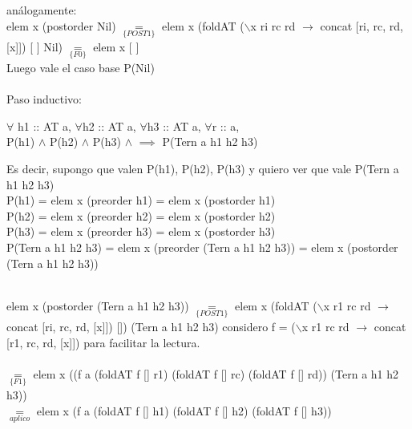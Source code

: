 \documentclass[10pt,a4paper]{article}
\begin{document}
\noindent análogamente: \\
elem x (postorder Nil) $\underset{\{POST1\}}{=}$ elem x (foldAT ($\backslash$x ri rc rd $\rightarrow$ concat [ri, rc, rd, [x]]) [ ] Nil) $\underset{\{F0\}}{=}$ elem x [ ] \\


Luego vale el caso base P(Nil)
\\ \\
Paso inductivo: 
\begin{center}
	$\forall$ h1 :: AT a, $\forall$h2 :: AT a, $\forall$h3 :: AT a, $\forall$r :: a, \\
	P(h1) $\land$ P(h2) $\land$ P(h3) $\land$ $\implies$ P(Tern a h1 h2 h3)
\end{center}
Es decir, supongo que valen P(h1), P(h2), P(h3) y quiero ver que vale P(Tern a h1 h2 h3) \\
P(h1) = elem x (preorder h1) = elem x (postorder h1) \\
P(h2) = elem x (preorder h2) = elem x (postorder h2) \\
P(h3) = elem x (preorder h3) = elem x (postorder h3) \\
P(Tern a h1 h2 h3) = elem x (preorder (Tern a h1 h2 h3)) = elem x (postorder (Tern a h1 h2 h3)) \\
\\
\noindent

elem x (postorder (Tern a h1 h2 h3)) $\underset{\{POST1\}}{=}$ elem x (foldAT ($\backslash$x r1 rc rd $\rightarrow$ concat [ri, rc, rd, [x]]) []) (Tern a h1 h2 h3)
considero f = ($\backslash$x r1 rc rd $\rightarrow$ concat [r1, rc, rd, [x]]) para facilitar la lectura.\\ \\
$\underset{\{F1\}}{=}$ elem x ((f a (foldAT f [] r1) (foldAT f [] rc) (foldAT f [] rd)) (Tern a h1 h2 h3)) \\
$\underset{aplico}{=}$ elem x (f a (foldAT f [] h1) (foldAT f [] h2) (foldAT f [] h3)) \\
\end{document}
